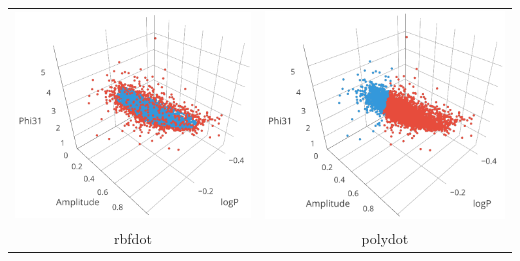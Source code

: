\begin{longtable}{ c c }
	\includegraphics[width=0.3\paperwidth]{images/ksvm_rbfdot.png} & \includegraphics[width=0.3\paperwidth]{images/ksvm_polydot.png} \\
	rbfdot & polydot \\

\end{longtable}
